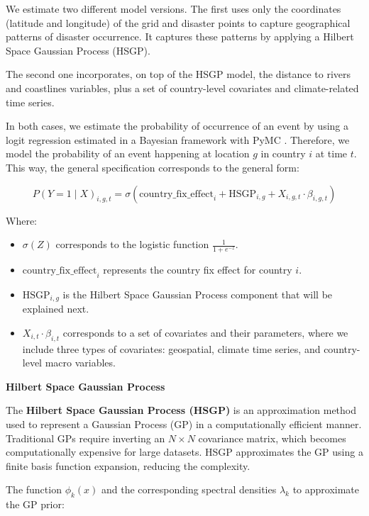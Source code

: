 We estimate two different model versions. The first uses only the coordinates (latitude and longitude) of the grid and disaster points to capture geographical patterns of disaster occurrence. It captures these patterns by applying a Hilbert Space Gaussian Process (HSGP).

The second one incorporates, on top of the HSGP model, the distance to rivers and coastlines variables, plus a set of country-level covariates and climate-related time series.

In both cases, we estimate the probability of occurrence of an event by using a logit regression estimated in a Bayesian framework with PyMC \citep{abril2023pymc}. Therefore, we model the probability of an event happening at location $g$ in country $i$ at time $t$. This way, the general specification corresponds to the general form:

\begin{equation}
P(Y=1 \mid X)_{i,g,t} = \sigma\left( \text{country\_fix\_effect}_i + \text{HSGP}_{i,g} + X_{i,g,t} \cdot \beta_{i,g,t} \right)
\end{equation}

Where:

\begin{itemize}
    \item $\sigma(Z)$ corresponds to the logistic function $\frac{1}{1+e^{-z}}$.
    \item $\text{country\_fix\_effect}_i$ represents the country fix effect for country $i$.
    \item $\text{HSGP}_{i,g}$ is the Hilbert Space Gaussian Process component that will be explained next.
    \item $X_{i,t} \cdot \beta_{i,t}$ corresponds to a set of covariates and their parameters, where we include three types of covariates: geospatial, climate time series, and country-level macro variables.
\end{itemize}

\textbf{Hilbert Space Gaussian Process}

The \textbf{Hilbert Space Gaussian Process (HSGP)} is an approximation method used to represent a Gaussian Process (GP) in a computationally efficient manner. Traditional GPs require inverting an $N \times N$ covariance matrix, which becomes computationally expensive for large datasets. HSGP approximates the GP using a finite basis function expansion, reducing the complexity.

The function $\phi_k(x)$ and the corresponding spectral densities $\lambda_k$ to approximate the GP prior:

